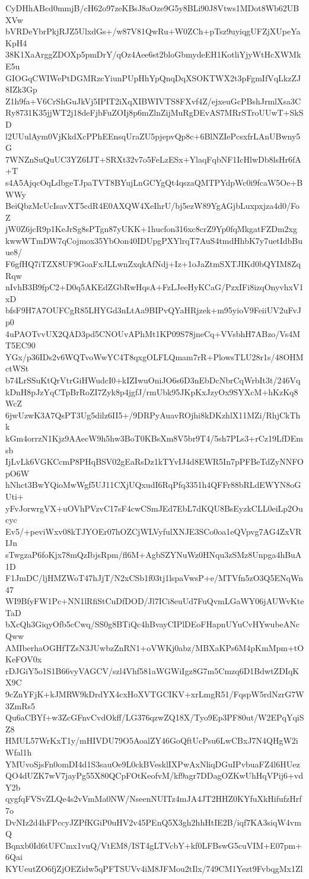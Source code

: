 CyDHhABcd0mmjB/cH62o97zeKBsJ8aOze9G5y8BLi90J8Vtws1MDot8Wb62UBXVw
bVRDeYbrPkjRJZ5UlxdGs+/w87V81QwRu+W0ZCh+pTsz9uyiqgUFZjXUpeYaKpH4
38K1XaArggZDOXp5pmDrY/qOz4Aee6st2bloGbmydeEH1KotliYjyWtHcXWMkE5u
GIOGqCWIWePtDGMRzcYiunPUpHhYpQnqDqXSOKTWX2t3pFgmIfVqLkzZJ8IZk3Gp
Z1h9fa+V6CrShGuJkVj5IPIT2iXqXIBWIVTS8FXvf4Z/ejxeuGcPBshJrmlXsa3C
Ry8731K35jjWT2j18deFjbFuZOIj8p6mZlnZijMuRgDEvAS7MRrSTroUUwT+SkSD
l2UUulAym0VjKkdXcPPhEEnsqUraZU5pjepvQp8c+6BlNZIePcsxfrLAnUBwny5G
7WNZnSuQuUC3YZ6IJT+SRXt32v7o5FeLzESx+YlaqFqbNF1IcHlwDb8lsHr6fA+T
s4A5AjqcOqLdbgeTJpaTVT8BYujLnGCYgQt4qszaQMTPYdpWc0i9fcaW5Oe+BWWy
BeiQbzMcUcIsavXT5cdR4E0AXQW4XeIhrU/bj5ezW89YgAGjbLuxpxjza4d0/FoZ
jW0Z6jcR9p1KeJrSg8sPTgn87yUKK+1hucfon316xc8crZ9Yp0fqMkgatFZDm2xg
kwwWTmDW7qCojmox35YbOon40IDUpgPXYlrqT7AuS4tmdHhbK7y7uetIdbBuue8/
F6gfHQ7iTZX8UF9GoaFxJLLwnZxqkAfNdj+Iz+1oJaZtmSXTJIKd0bQYIM8ZqRqw
nIvhB3B9fpC2+D0q5AKEdZGbRwHqsA+FzLJeeHyKCaG/PzxIFi8izqOnyvhxV1xD
bfsF9H7A7OUFCgR85LHYGd3nLtAa9BIPvQYaHRjzek+m95yioV9FeiiUV2uFvJp0
4uPAOTvvUX2QAD3pd5CNOUvAPhMt1KP09S78jneCq+VVsbhH7ABzo/Vs4MT5EC90
YGx/p36IDs2v6WQTvoWwYC4T8qxgOLFLQmam7rR+PlowsTLU28r1s/48OHMctWSt
b74LrSSuKtQrVtrGiHWudcI0+kIZIwuOniJO6s6D3nEbDcNbrCqWrbIt3t/246Vq
kDnH8pJzYqCTpBrRoZI7Zyk8p4jgfJ/rmUbk95JKpKxJzyOx9SYXcM+hKzKq8WcZ
6jwUzwK3A7QsPT3Ug5dilz6II5+/9DRPyAuavROjhi8kDKzhlX11MZi/RhjCkThk
kGm4orrzN1Kjz9AAecW9h5hw3BoT0KBsXm8V5br9T4/5sh7PLs3+rCz19LfDEmsb
IjLvLk6VGKCcmP8PHqBSV02gEaRsDz1kTYvIJ4d8EWR5In7pPFBeTdZyNNFOpO6W
hNhct3BwYQioMwWgf5UJ11CXjUQxudI6RqPfq3351h4QFFr88bRLdEWYN8oGUti+
yFvJorwrgVX+uOVhPVzvC17sF4cwCSmJEd7EbL7dKQU8BsEyzkCLL0eiLp2Oucyc
Ev5/+peviWxv08kTJYOEr07hOZCjWLVyfulXNJE3SCo0oa1eQVpvg7AG4ZxVRIJn
sTwgzaP6foKjx78mQzIbjsRpm/fl6M+AgbSZYNuWz0HNqu3zSMz8Unpga4hBuA1D
F1JmDC/ljHMZWoT47hJjT/N2xCSb1f03tj1lspaVwsP+e/MTVfn5zO3Q5ENqWn47
WI9BfyFW1Pc+NN1lRfiStCuDfDOD/Jl7ICi8euUd7FuQvmLGaWY06jAUWvKteTaD
bXcQh3GiqyOfb5cCwq/SS0g8BTiQc4hBvayCIPlDEoFHapnUYuCvHYwubeANcQww
AMIberhaOGHfTZsN3JUwbzZnRN1+oVWKj0abz/MBXaKPs6M4pKmMpm+tOKeFOV0x
rDJGiY5o1S1B66vyVAGCV/szl4Vhf581aWGWiIgz8G7m5Cmzq6D1BdwtZDIqKX9C
9cZnYFjK+kJMRW9kDrdYX4cxHoXVTGCIKV+xrLmgR51/FqspW5rdNzrG7W3ZmRs5
Qu6aCBYf+w3ZcGFnvCvdOkff/LG376qzwZQ18X/Tyo9Ep3PF80ut/W2EPqYqiSZ8
HMUL57WrKxT1y/mHIVDU79O5AoalZY46GoQftUcPsu6LwCBxJ7N4QHgW2iWfal1h
YMUvoSjsFn0omDI4d1S3sauOe9L0ckBVesklIXPwAxNliqDGuIPvbuaFZ4l6HUez
QO4dUZK7wV7jayPg55X80QCpFOtKeofvM/kf9agr7DDagOZKwUhHqVPij6+vdY2b
qygfqFVSvZLQe4s2vVmMa0NW/NseenNUITz4mJA4JT2HHZ0KYfuXkHifufzHrf7o
DvNIz2d4hFPccyJZPfKGiP0uHV2v45PEnQ5X3gh2hhHtIE2B/iqf7KA3siqW4vmQ
Bqnxb0Id6tUFCmx1vuQ/VtEM8/IST4gLTVcbY+kf0LFBswG5cuVIM+E07pm+6Qai
KYUeutZO6fjZjOEZidw5qPFTSUVv4iM8JFMou2tIlx/749CM1Yezt9FvbqgMx1Zl

